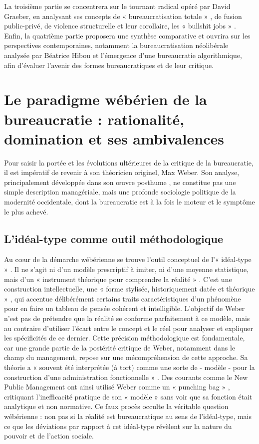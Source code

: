 La troisième partie se concentrera sur le tournant radical opéré par David Graeber, en analysant ses concepts de « bureaucratisation totale » , de fusion public-privé, de violence structurelle et leur corollaire, les « bullshit jobs » . Enfin, la quatrième partie proposera une synthèse comparative et ouvrira sur les perspectives contemporaines, notamment la bureaucratisation néolibérale analysée par Béatrice Hibou et l'émergence d'une bureaucratie algorithmique, afin d'évaluer l'avenir des formes bureaucratiques et de leur critique.

\chapter{Le paradigme wébérien de la bureaucratie : rationalité, domination et ses ambivalences}

Pour saisir la portée et les évolutions ultérieures de la critique de la bureaucratie, il est impératif de revenir à son théoricien originel, Max Weber. Son analyse, principalement développée dans son œuvre posthume \citep{Weber1922}, ne constitue pas une simple description managériale, mais une profonde sociologie politique de la modernité occidentale, dont la bureaucratie est à la fois le moteur et le symptôme le plus achevé.

\section{L'idéal-type comme outil méthodologique}
Au cœur de la démarche wébérienne se trouve l'outil conceptuel de l'« idéal-type » . Il ne s'agit ni d'un modèle prescriptif à imiter, ni d'une moyenne statistique, mais d'un « instrument théorique pour comprendre la réalité » . C'est une construction intellectuelle, une « forme stylisée, historiquement datée et théorique » , qui accentue délibérément certains traits caractéristiques d'un phénomène pour en faire un tableau de pensée cohérent et intelligible. L'objectif de Weber n'est pas de prétendre que la réalité se conforme parfaitement à ce modèle, mais au contraire d'utiliser l'écart entre le concept et le réel pour analyser et expliquer les spécificités de ce dernier.
Cette précision méthodologique est fondamentale, car une grande partie de la postérité critique de Weber, notamment dans le champ du management, repose sur une mécompréhension de cette approche. Sa théorie a « souvent été interprétée (à tort) comme une sorte de - modèle - pour la construction d'une administration fonctionnelle » . Des courants comme le New Public Management ont ainsi utilisé Weber comme un « punching bag » , critiquant l'inefficacité pratique de son « modèle »  sans voir que sa fonction était analytique et non normative. Ce faux procès occulte la véritable question wébérienne : non pas si la réalité est bureaucratique au sens de l'idéal-type, mais ce que les déviations par rapport à cet idéal-type révèlent sur la nature du pouvoir et de l'action sociale.

